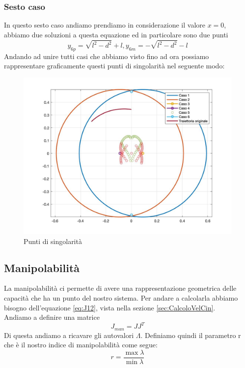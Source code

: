 \subsubsection{Sesto caso}
In questo sesto caso andiamo prendiamo in considerazione il valore $x=0$, abbiamo due soluzioni a questa equazione ed in particolare sono due punti
\begin{equation}
    y_{6p} = \sqrt{l^2-d^2}+l , y_{6m} = -\sqrt{l^2-d^2}-l
\end{equation}
Andando ad unire tutti casi che abbiamo visto fino ad ora possiamo rappresentare graficamente questi punti di singolarità nel seguente modo:
\begin{figure}[ht]
\begin{center}
    \includegraphics[scale=0.35]{Immagini/sing.jpg}
    \caption{Punti di singolarità}
\end{center}
\end{figure}
\subsection{Manipolabilità}
La manipolabilità ci permette di avere una rappresentazione geometrica delle capacità che ha un punto del nostro sistema. Per andare a calcolarla abbiamo bisogno dell'equazione \ref{eq:J12}, vista nella sezione \ref{sec:CalcoloVelCin}.
\\Andiamo a definire una matrice
\begin{equation*}
    J_{man} = JJ^T
\end{equation*}
Di questa andiamo a ricavare gli autovalori $\Lambda$. Definiamo quindi il parametro r che è il nostro indice di manipolabilità come segue:
\begin{equation}
    r = \frac{\max\lambda}{\min\lambda}
\end{equation}
